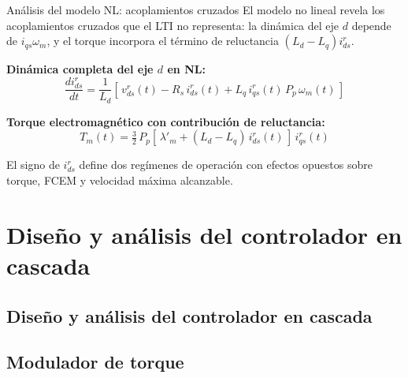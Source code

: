 \documentclass[aspectratio=169,t]{beamer}
\newcommand{\SecPresentacion}{Presentación del problema}
\newcommand{\SecMecanico}{Subsistema mecánico equivalente}
\newcommand{\SecElectromagnetico}{Subsistema electromagnético en coordenadas qd0}
\newcommand{\SecTermico}{Subsistema térmico}
\newcommand{\SecNLGlobal}{Sistema No Lineal Global}
\newcommand{\SecLPV}{Linealización Jacobiana (LPV)}
\newcommand{\SecLTI}{Obtención del modelo LTI equivalente}
\newcommand{\SecAnalisisLTI}{Análisis del modelo LTI aumentado}
\newcommand{\SecDinamica}{Respuesta dinámica en dominio del tiempo}
\newcommand{\SecControlador}{Diseño y análisis del controlador en cascada}
\newcommand{\SecVerifSpecs}{Verificación de desempeño: Especificaciones de operación}
\newcommand{\SecVerifOffset}{Verificación de desempeño: Offset de estado estacionario}
\newcommand{\SecVerifNoIdealidades}{Verificación de desempeño: No idealidades y comportamiento térmico}
\newcommand{\SecDiscretizacion}{Discretización del controlador}
\newcommand{\SecSoftware}{Codificación del software de control}
\newcommand{\AgendaItem}[3]{%
  \ifnum#1=#2
    {\scriptsize\bfseries\color{uncBlue}%
      \hyperlink{sec:#1}{\makebox[2.2em][r]{#1.}\hspace{0.7em}%
      \parbox[t]{0.86\textwidth}{#3}}\par}%
  \else
    {\scriptsize\color{black!26}%
      \hyperlink{sec:#1}{\makebox[2.2em][r]{#1.}\hspace{0.7em}%
      \parbox[t]{0.86\textwidth}{#3}}\par}%
  \fi
  \vspace{0.35mm}%
}
\newcommand{\AgendaBody}[1]{%
    \vspace{3mm}
    {\Large\bfseries\color{uncBlue}Tabla de contenidos\par}
    \vspace{2mm}
    \begin{minipage}{0.94\textwidth}
      \AgendaItem{1}{#1}{\SecPresentacion}
      \AgendaItem{2}{#1}{\SecMecanico}
      \AgendaItem{3}{#1}{\SecElectromagnetico}
      \AgendaItem{4}{#1}{\SecTermico}
      \AgendaItem{5}{#1}\SecNLGlobal
      \AgendaItem{6}{#1}{\SecLPV}
      \AgendaItem{7}{#1}{\SecLTI}
      \AgendaItem{8}{#1}{\SecAnalisisLTI}
      \AgendaItem{9}{#1}{\SecDinamica}
      \AgendaItem{10}{#1}{\SecControlador}
      \AgendaItem{11}{#1}{\SecVerifSpecs}
      \AgendaItem{12}{#1}{\SecVerifOffset}
      \AgendaItem{13}{#1}{\SecVerifNoIdealidades}
      \AgendaItem{14}{#1}{\SecDiscretizacion}
      \AgendaItem{15}{#1}{\SecSoftware}
    \end{minipage}
    \vfill
}
\newcommand{\AgendaSlideTarget}[2]{%
  \begin{frame}[plain]
    \hypertarget{#2}{}%
    \AgendaBody{#1}
  \end{frame}
}
\newcommand{\StartProjectSection}[2]{%
  \section{#2}%
  \subsection{#2}%
  \AgendaSlideTarget{#1}{sec:#1}%
}
\begin{document}
\begin{frame}{Análisis del modelo NL: acoplamientos cruzados}
{\small\color{uncGray}El modelo no lineal revela los acoplamientos cruzados que el LTI no representa: la dinámica del eje $d$ depende de $i_{qs}\omega_m$, y el torque incorpora el término de reluctancia $(L_d-L_q)i_{ds}^{r}$.}\par
\vspace{3mm}

\textbf{Dinámica completa del eje $d$ en NL:}
\begin{equation*}
\frac{di_{ds}^{r}}{dt} = \frac{1}{L_d}\!\left[\,v_{ds}^{r}(t) - R_s\,i_{ds}^{r}(t) + L_q\,i_{qs}^{r}(t)\,P_p\,\omega_m(t)\,\right]
\end{equation*}

\textbf{Torque electromagnético con contribución de reluctancia:}
\begin{equation*}
T_m(t) = \tfrac{3}{2}\,P_p\!\left[\,\lambda'_m + (L_d - L_q)\,i_{ds}^{r}(t)\,\right]\,i_{qs}^{r}(t)
\end{equation*}

\vspace{2mm}
{\small El signo de $i_{ds}^{r}$ define dos regímenes de operación con efectos opuestos sobre torque, FCEM y velocidad máxima alcanzable.}
\end{frame}


\StartProjectSection{10}{\SecControlador}
\subsection{Modulador de torque}
\end{document}
